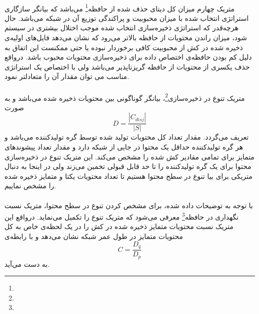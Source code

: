 \paragraph{}
متریک چهارم میزان کل دیتای حذف شده از حافظه\footnote{} می‌باشد که بیانگر سازگاری استراتژی انتخاب شده با میزان محبوبیت و پراکندگی توزیع آن در شبکه می‌باشد. حال هرچه‌قدر که استراتژی ذخیره‌سازی انتخاب شده موجب اختلال بیشتری در سیستم شود، میزان راندن محتویات از حافظه بالاتر می‌رود که نشان می‌دهد فایل‌های اولیه‌ی ذخیره شده در کش از محبوبیت کافی برخوردار نبوده یا حتی ممکنست این اتفاق به دلیل کم بودن حافظه‌ی اختصاص داده برای ذخیره‌سازی محتویات محبوب باشد. درواقع حذف یکسری از محتویات از حافظه گریزناپذیر می‌باشد ولی با اختصاص یک استراتژی مناسب می توان مقدار آن را متعادلتر نمود.

\paragraph{}
متریک تنوع در ذخیره‌سازی\footnote{}، بیانگر گوناگونی بین محتویات ذخیره شده می‌باشد و به صورت 
\begin{equation}\label{eq1}
	D = \frac{|C_{disj}|}{|S|}
\end{equation}
تعریف می‌گردد. مقدار  تعداد کل محتویات تولید شده توسط گره تولیدکننده می‌باشد و هر گره تولیدکننده حداقل یک محتوا در جایی از شبکه دارد و مقدار 
تعداد پیشوندهای متمایز برای تمامی مقادیر کش شده را مشخص می‌کند. این متریک تنوع در ذخیره‌سازی محتوا برای یک گره تولیدکننده را تا حد قابل قبولی تخمین می‌زند ولی در اینجا به دنبال متریکی برای بیا تنوع در سطح محتوا هستیم تا تعداد محتویات یکتا  و متمایز ذخیره شده را مشخص نماییم.

\paragraph{}
با توجه به توضیحات داده شده، برای مشخص کردن تنوع در سطح محتوا، متریک  نسبت نگهداری در حافظه\footnote{} معرفی می‌شود که متریک تنوع را تکمیل می‌نماید. درواقع این متریک نسبت محتویات متمایز ذخیره شده در کش را در یک لحظه‌ی خاص به کل محتویات متمایز در طول عمر شبکه نشان می‌دهد و با رابطه‌ی 
\begin{equation}\label{eq1}
	C = \frac{D_q}{D_p}
\end{equation}
به دست می‌آید. 

